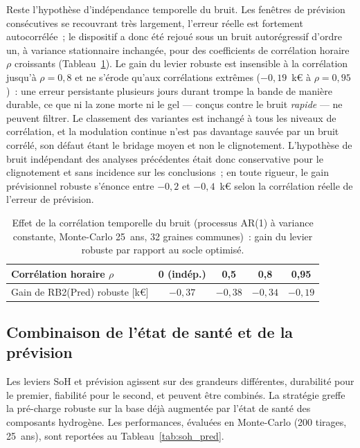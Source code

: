 Reste l'hypothèse d'indépendance temporelle du bruit. Les fenêtres de prévision consécutives se recouvrant très largement, l'erreur réelle est fortement autocorrélée~; le dispositif a donc été rejoué sous un bruit autorégressif d'ordre un, à variance stationnaire inchangée, pour des coefficients de corrélation horaire $\rho$ croissants (Tableau~\ref{tab:rho_sweep}). Le gain du levier robuste est insensible à la corrélation jusqu'à $\rho = 0{,}8$ et ne s'érode qu'aux corrélations extrêmes ($-0{,}19$~k€ à $\rho = 0{,}95$)~: une erreur persistante plusieurs jours durant trompe la bande de manière durable, ce que ni la zone morte ni le gel — conçus contre le bruit \emph{rapide} — ne peuvent filtrer. Le classement des variantes est inchangé à tous les niveaux de corrélation, et la modulation continue n'est pas davantage sauvée par un bruit corrélé, son défaut étant le bridage moyen et non le clignotement. L'hypothèse de bruit indépendant des analyses précédentes était donc conservative pour le clignotement et sans incidence sur les conclusions~; en toute rigueur, le gain prévisionnel robuste s'énonce entre $-0{,}2$ et $-0{,}4$~k€ selon la corrélation réelle de l'erreur de prévision.

\begin{table}[h!]
\centering
\caption{Effet de la corrélation temporelle du bruit (processus AR(1) à variance constante, Monte-Carlo 25~ans, 32 graines communes)~: gain du levier robuste par rapport au socle optimisé.}
\label{tab:rho_sweep}
\begin{tabular}{lcccc}
\hline
Corrélation horaire $\rho$ & 0 (indép.) & 0,5 & 0,8 & 0,95 \\
\hline
Gain de RB2(Pred) robuste [k€] & $-0{,}37$ & $-0{,}38$ & $-0{,}34$ & $-0{,}19$ \\
\hline
\end{tabular}
\end{table}


\subsection{Combinaison de l'état de santé et de la prévision}
\label{subsec:soh_pred}

Les leviers SoH et prévision agissent sur des grandeurs différentes, durabilité pour le premier, fiabilité pour le second, et peuvent être combinés. La stratégie \RBshp{} greffe la pré-charge robuste sur la base déjà augmentée par l'état de santé des composants hydrogène. Les performances, évaluées en Monte-Carlo (\num{200} tirages, 25~ans), sont reportées au Tableau~\ref{tab:soh_pred}.

